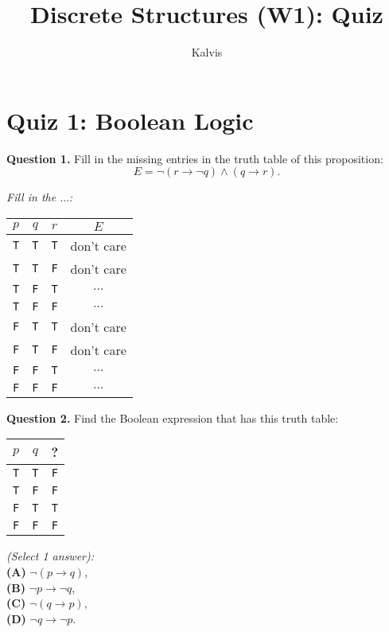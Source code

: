 \documentclass[jou]{apa6}
\title{Discrete Structures (W1): Quiz}
\author{Kalvis}
\affiliation{RBS}
\begin{document}

\twocolumn

\section{Quiz 1: Boolean Logic}

{\bf Question 1.} Fill in the missing entries in the truth table of this proposition:
$$E = \neg(r \rightarrow \neg q) \wedge (q \rightarrow r).$$

\vspace{3pt}
\noindent
{\em Fill in the $\ldots$:}

\begin{tabular}{ c | c | c | c }
$p$ & $q$ & $r$ & $E$ \\ \hline
{\tt T} & {\tt T} & {\tt T} & don't care \\ \hline
{\tt T} & {\tt T} & {\tt F} & don't care \\ \hline
{\tt T} & {\tt F} & {\tt T} & $\ldots$ \\ \hline
{\tt T} & {\tt F} & {\tt F} & $\ldots$ \\ \hline
{\tt F} & {\tt T} & {\tt T} & don't care \\ \hline
{\tt F} & {\tt T} & {\tt F} & don't care \\ \hline
{\tt F} & {\tt F} & {\tt T} & $\ldots$ \\ \hline
{\tt F} & {\tt F} & {\tt F} & $\ldots$ \\ \hline
\end{tabular}

\vspace{10pt}
{\bf Question 2.} Find the Boolean expression that has this truth table:

\begin{tabular}{ c | c | c }
$p$ & $q$ & ? \\ \hline
{\tt T} & {\tt T} & {\tt F} \\ \hline
{\tt T} & {\tt F} & {\tt F} \\ \hline
{\tt F} & {\tt T} & {\tt T} \\ \hline
{\tt F} & {\tt F} & {\tt F} \\ \hline
\end{tabular}

\noindent
\vspace{3pt}
{\em (Select 1 answer):}\\
{\bf (A)} $\neg (p \rightarrow q)$,\\
{\bf (B)} $\neg p \rightarrow \neg q$,\\
{\bf (C)} $\neg (q \rightarrow p)$,\\
{\bf (D)} $\neg q \rightarrow \neg p$.
\end{document}
